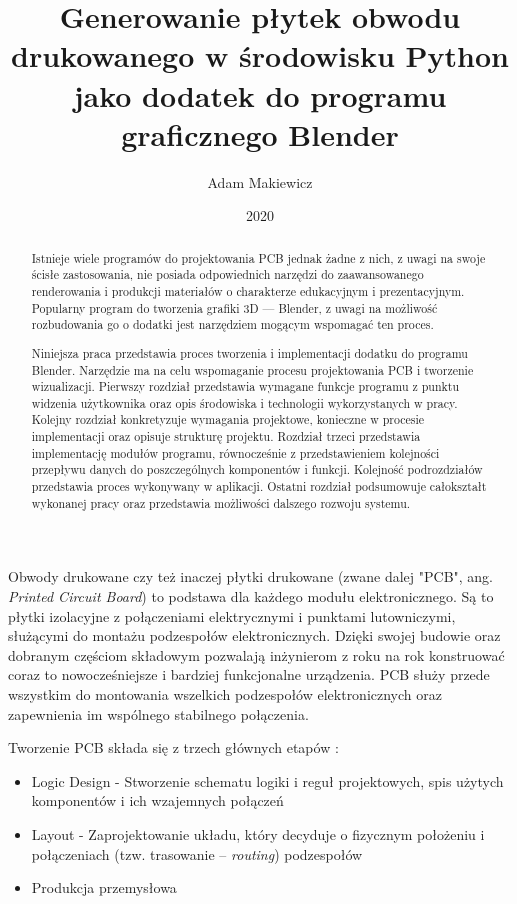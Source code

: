 \documentclass{xmgr}
\author   {Adam Makiewicz}
\title    {Generowanie płytek obwodu drukowanego w środowisku Python jako dodatek do programu graficznego Blender}
\date     {2020}
\begin{document}
\begin{abstract}
Istnieje wiele programów do projektowania PCB jednak żadne z nich, z uwagi na swoje ścisłe zastosowania, nie posiada odpowiednich narzędzi do zaawansowanego renderowania i produkcji materiałów o charakterze edukacyjnym i prezentacyjnym. Popularny program do tworzenia grafiki 3D --- Blender, z uwagi na możliwość rozbudowania go o dodatki jest narzędziem mogącym wspomagać ten proces.

Niniejsza praca przedstawia proces tworzenia i implementacji dodatku do programu Blender. Narzędzie ma na celu wspomaganie procesu projektowania PCB i tworzenie wizualizacji. Pierwszy rozdział przedstawia wymagane funkcje programu z punktu widzenia użytkownika oraz opis środowiska i technologii wykorzystanych w pracy.
Kolejny rozdział konkretyzuje wymagania projektowe, konieczne w procesie implementacji oraz opisuje strukturę projektu.
Rozdział trzeci przedstawia implementację modułów programu, równocześnie z przedstawieniem kolejności przepływu danych do poszczególnych komponentów i funkcji. Kolejność podrozdziałów przedstawia proces wykonywany w aplikacji. Ostatni rozdział podsumowuje całokształt wykonanej pracy oraz przedstawia możliwości dalszego rozwoju systemu.
\end{abstract}



\maketitle

\introduction

Obwody drukowane czy też inaczej płytki drukowane (zwane dalej "PCB", ang. \emph{Printed Circuit Board}) to podstawa dla każdego modułu elektronicznego. Są to płytki izolacyjne z połączeniami elektrycznymi i punktami lutowniczymi, służącymi do montażu podzespołów elektronicznych. Dzięki swojej budowie oraz dobranym częściom składowym pozwalają inżynierom z roku na rok konstruować coraz to nowocześniejsze i bardziej funkcjonalne urządzenia. PCB służy przede wszystkim do montowania wszelkich podzespołów elektronicznych oraz zapewnienia im wspólnego stabilnego połączenia.

\vspace{5mm}
Tworzenie PCB składa się z trzech głównych etapów \cite{Abboud}:

\begin{itemize}
\item
Logic Design - Stworzenie schematu logiki i reguł projektowych, spis użytych komponentów i ich wzajemnych połączeń
\item
Layout - Zaprojektowanie układu, który decyduje o fizycznym położeniu i połączeniach (tzw. trasowanie -- \emph{routing}) podzespołów
\item
Produkcja przemysłowa
\end{itemize}
    
\end{document}
